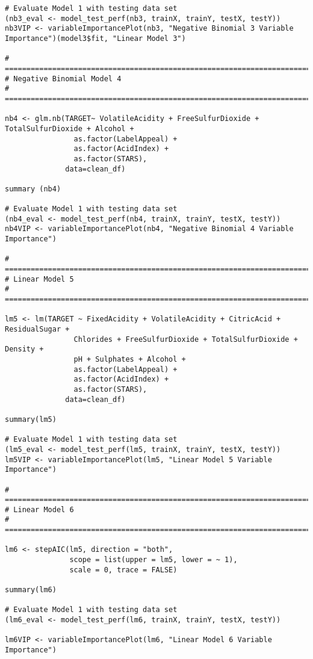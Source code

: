 \documentclass[
]{article}
\begin{document}
\begin{verbatim}
# Evaluate Model 1 with testing data set
(nb3_eval <- model_test_perf(nb3, trainX, trainY, testX, testY))
nb3VIP <- variableImportancePlot(nb3, "Negative Binomial 3 Variable Importance")(model3$fit, "Linear Model 3")

# =====================================================================================
# Negative Binomial Model 4
# =====================================================================================

nb4 <- glm.nb(TARGET~ VolatileAcidity + FreeSulfurDioxide + TotalSulfurDioxide + Alcohol +
                as.factor(LabelAppeal) +
                as.factor(AcidIndex) + 
                as.factor(STARS),
              data=clean_df)

summary (nb4)

# Evaluate Model 1 with testing data set
(nb4_eval <- model_test_perf(nb4, trainX, trainY, testX, testY))
nb4VIP <- variableImportancePlot(nb4, "Negative Binomial 4 Variable Importance")

# =====================================================================================
# Linear Model 5
# =====================================================================================

lm5 <- lm(TARGET ~ FixedAcidity + VolatileAcidity + CitricAcid + ResidualSugar + 
                Chlorides + FreeSulfurDioxide + TotalSulfurDioxide + Density +
                pH + Sulphates + Alcohol + 
                as.factor(LabelAppeal) +
                as.factor(AcidIndex) +
                as.factor(STARS),
              data=clean_df)

summary(lm5)

# Evaluate Model 1 with testing data set
(lm5_eval <- model_test_perf(lm5, trainX, trainY, testX, testY))
lm5VIP <- variableImportancePlot(lm5, "Linear Model 5 Variable Importance")

# =====================================================================================
# Linear Model 6
# =====================================================================================

lm6 <- stepAIC(lm5, direction = "both",
               scope = list(upper = lm5, lower = ~ 1),
               scale = 0, trace = FALSE)

summary(lm6)

# Evaluate Model 1 with testing data set
(lm6_eval <- model_test_perf(lm6, trainX, trainY, testX, testY))

lm6VIP <- variableImportancePlot(lm6, "Linear Model 6 Variable Importance")



\end{verbatim}
\end{document}
